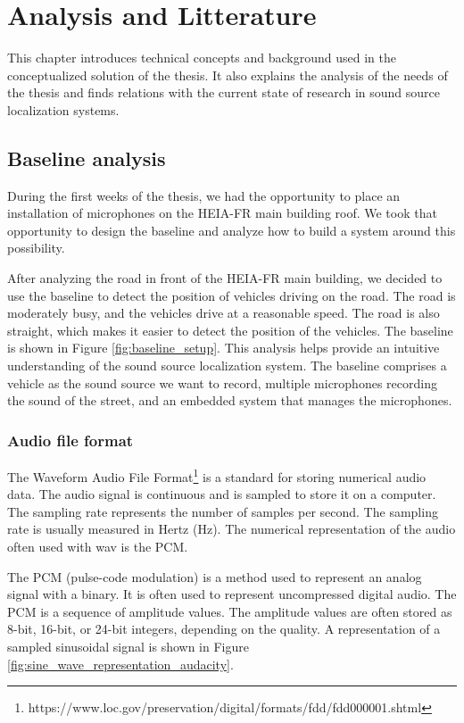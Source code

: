 \chapter{Analysis and Litterature}
\label{ch:background}

This chapter introduces technical concepts and background used in the conceptualized solution of the thesis. It also explains the analysis of the needs of the thesis and finds relations with the current state of research in sound source localization systems.

\section{Baseline analysis}
\label{sec:baseline_analysis}

During the first weeks of the thesis, we had the opportunity to place an installation of microphones on the HEIA-FR main building roof. We took that opportunity to design the baseline and analyze how to build a system around this possibility.

After analyzing the road in front of the HEIA-FR main building, we decided to use the baseline to detect the position of vehicles driving on the road. The road is moderately busy, and the vehicles drive at a reasonable speed. The road is also straight, which makes it easier to detect the position of the vehicles. The baseline is shown in Figure \ref{fig:baseline_setup}. This analysis helps provide an intuitive understanding of the sound source localization system. The baseline comprises a vehicle as the sound source we want to record, multiple microphones recording the sound of the street, and an embedded system that manages the microphones.

\subsection{Audio file format}
\label{subsec:audio_file_format}

The Waveform Audio File Format\footnote{https://www.loc.gov/preservation/digital/formats/fdd/fdd000001.shtml} is a standard for storing numerical audio data. The audio signal is continuous and is sampled to store it on a computer. The sampling rate represents the number of samples per second. The sampling rate is usually measured in Hertz (Hz). The numerical representation of the audio often used with wav is the PCM.

The PCM (pulse-code modulation)\cite{5059525} is a method used to represent an analog signal with a binary. It is often used to represent uncompressed digital audio. The PCM is a sequence of amplitude values. The amplitude values are often stored as 8-bit, 16-bit, or 24-bit integers, depending on the quality. A representation of a sampled sinusoidal signal is shown in Figure \ref{fig:sine_wave_representation_audacity}.

